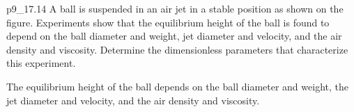 
\begin{problemwithimage}[0.25\linewidth]{p9_1}{7.14}
  A ball is suspended in an air jet in a stable position as shown on the figure.
  Experiments show that the equilibrium height of the ball is found to depend on the ball diameter and weight, jet diameter and velocity, and the air density and viscosity.
  Determine the dimensionless parameters that characterize this experiment.
\end{problemwithimage}

\begin{assumptions}
  \item The equilibrium height of the ball depends on the ball diameter and weight, the jet diameter and velocity, and the air density and viscosity.
\end{assumptions}

